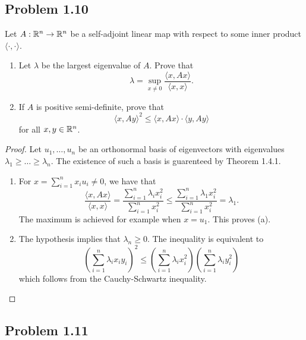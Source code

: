 \documentclass[12pt]{article}
\begin{document}
\subsection{Problem 1.10}

\begin{problem} \label{problem-1.10}
	Let $A : \mathbb{R}^n \to \mathbb{R}^n$ be a self-adjoint linear map with respect to some inner product $\langle \cdot, \cdot \rangle$. 
	\begin{enumerate}[label = (\alph*)]
		\item Let $\lambda$ be the largest eigenvalue of $A$. Prove that 
		\[
			\lambda = \sup_{x \neq 0} \frac{\langle x, Ax \rangle}{\langle x, x \rangle}.
		\]

		\item If $A$ is positive semi-definite, prove that 
		\[
			\langle x, Ay \rangle^2 \leq \langle x, Ax \rangle \cdot \langle y, Ay \rangle
		\]
		for all $x, y \in \mathbb{R}^n$. 
	\end{enumerate}
\end{problem}

\begin{proof}
	Let $u_1, \ldots, u_n$ be an orthonormal basis of eigenvectors with eigenvalues $\lambda_1 \geq \ldots \geq \lambda_n$. The existence of such a basis is guarenteed by Theorem 1.4.1.
	\begin{enumerate}[label = (\alph*)]
		\item For $x = \sum_{i = 1}^n x_i u_i \neq 0$, we have that 
		\[
			\frac{\langle x, Ax \rangle}{\langle x, x \rangle} = \frac{\sum_{i = 1}^n \lambda_i x_i^2}{\sum_{i = 1}^n x_i^2} \leq \frac{\sum_{i = 1}^n \lambda_1 x_i^2}{\sum_{i = 1}^n x_i^2} = \lambda_1.
		\]
		The maximum is achieved for example when $x = u_1$. This proves (a). 

		\item The hypothesis implies that $\lambda_n \geq 0$. The inequality is equivalent to 
		\[
			\left ( \sum_{i = 1}^n \lambda_i x_i y_i \right )^2 \leq \left ( \sum_{i = 1}^n \lambda_i x_i^2 \right) \left ( \sum_{i = 1}^n \lambda_i y_i^2 \right )
		\]
		which follows from the Cauchy-Schwartz inequality. 
	\end{enumerate}
\end{proof}

\newpage 

\subsection{Problem 1.11}
\end{document}
